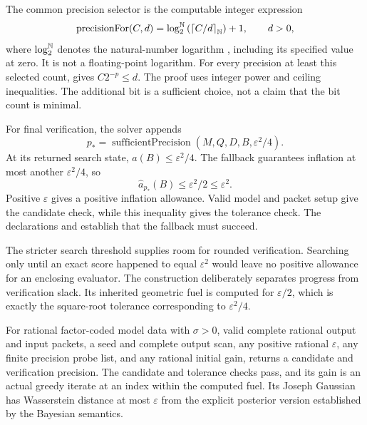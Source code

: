 The common precision selector is the computable integer expression
\begin{equation}
 \operatorname{precisionFor}(C,d)
 =\log^{\mathbb N}_2\left(\left\lceil C/d\right\rceil_{\mathbb N}\right)+1,
 \qquad d>0,
 \label{eq:solver-precision}
\end{equation}
where $\log^{\mathbb N}_2$ denotes the natural-number logarithm , including its
specified value at zero. It is not a floating-point logarithm. For every precision
at least this selected count,  gives $C2^{-p}\le d$.
The proof uses integer power and ceiling inequalities. The additional bit is a
sufficient choice, not a claim that the bit count is minimal.

For final verification, the solver appends
\[
 p_* = \operatorname{sufficientPrecision}(M,Q,D,B,\varepsilon^2/4).
\]
At its returned search state, $a(B)\le\varepsilon^2/4$. The fallback guarantees
inflation at most another $\varepsilon^2/4$, so
\[
 \widehat a_{p_*}(B)\le\varepsilon^2/2\le\varepsilon^2.
\]
Positive $\varepsilon$ gives a positive inflation allowance. Valid model and
packet setup give the candidate check, while this inequality gives the tolerance
check. The declarations  and
 establish that the fallback must succeed.

The stricter search threshold supplies room for rounded verification. Searching
only until an exact score happened to equal $\varepsilon^2$ would leave no positive
allowance for an enclosing evaluator. The construction deliberately separates
progress from verification slack. Its inherited geometric fuel is computed for
$\varepsilon/2$, which is exactly the square-root tolerance corresponding to
$\varepsilon^2/4$.

\begin{theorem}
For rational factor-coded model data with $\sigma>0$, valid complete rational
output and input packets, a seed and complete output scan, any positive rational
$\varepsilon$, any finite precision probe list, and any rational initial gain,
 returns a candidate and verification precision. The candidate
and tolerance checks pass, and its gain is an actual greedy iterate at an index
within the computed fuel. Its Joseph Gaussian has Wasserstein distance at most
$\varepsilon$ from the explicit posterior version established by the Bayesian
semantics.
\end{theorem}

